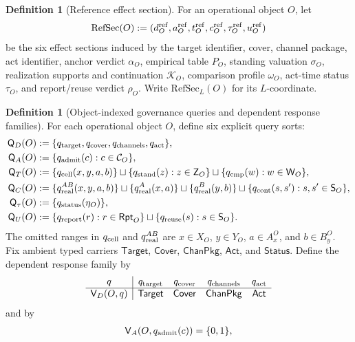\documentclass[11pt]{article}
\theoremstyle{definition}
\newtheorem{definition}[theorem]{Definition}
\newcommand{\RefSec}{\mathrm{RefSec}}
\begin{document}
\begin{definition}[Reference effect section]\label{def:earlyreferencesection}
For an operational object $O$, let
\[
\RefSec(O):=(d_O^{\rm ref},a_O^{\rm ref},t_O^{\rm ref},c_O^{\rm ref},\tau_O^{\rm ref},u_O^{\rm ref})
\]
be the six effect sections induced by the target identifier, cover, channel package, act identifier, anchor verdict $\alpha_O$, empirical table $P_O$, standing valuation $\sigma_O$, realization supports and continuation $\mathcal K_O$, comparison profile $\omega_O$, act-time status $\tau_O$, and report/reuse verdict $\rho_O$. Write $\RefSec_L(O)$ for its $L$-coordinate.
\end{definition}

\begin{definition}[Object-indexed governance queries and dependent response families]\label{def:objectqueries}
For each operational object $O$, define six explicit query sorts:
\[
\begin{aligned}
\mathsf Q_D(O)&:=\{q_{\rm target},q_{\rm cover},q_{\rm channels},q_{\rm act}\},\\
\mathsf Q_A(O)&:=\{q_{\rm admit}(c):c\in\mathcal C_O\},\\
\mathsf Q_T(O)&:=\{q_{\rm cell}(x,y,a,b)\}\sqcup\{q_{\rm stand}(z):z\in\mathsf Z_O\}
                    \sqcup\{q_{\rm cmp}(w):w\in\mathsf W_O\},\\
\mathsf Q_C(O)&:=\{q^{AB}_{\rm real}(x,y,a,b)\}\sqcup
                    \{q^{A}_{\rm real}(x,a)\}\sqcup\{q^{B}_{\rm real}(y,b)\}\sqcup
                    \{q_{\rm cont}(s,s'):s,s'\in\mathsf S_O\},\\
\mathsf Q_{\tau}(O)&:=\{q_{\rm status}(\eta_O)\},\\
\mathsf Q_U(O)&:=\{q_{\rm report}(r):r\in\mathsf{Rpt}_O\}\sqcup
                    \{q_{\rm reuse}(s):s\in\mathsf S_O\}.
\end{aligned}
\]
The omitted ranges in $q_{\rm cell}$ and $q^{AB}_{\rm real}$ are $x\in X_O$, $y\in Y_O$, $a\in A_x^O$, and $b\in B_y^O$. Fix ambient typed carriers $\mathsf{Target}$, $\mathsf{Cover}$, $\mathsf{ChanPkg}$, $\mathsf{Act}$, and $\mathsf{Status}$. Define the dependent response family by
\[
\begin{array}{c|cccc}
q&q_{\rm target}&q_{\rm cover}&q_{\rm channels}&q_{\rm act}\\ \hline
\mathsf V_D(O,q)&\mathsf{Target}&\mathsf{Cover}&\mathsf{ChanPkg}&\mathsf{Act}
\end{array}
\]
and by
\[
\begin{aligned}
\mathsf V_A(O,q_{\rm admit}(c))&=\{0,1\},\\

\end{aligned}\]
\end{definition}
\end{document}
